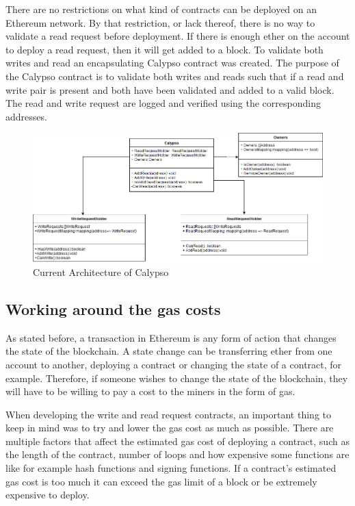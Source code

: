 \documentclass[12pt]{article}
\begin{document}
There are no restrictions on what kind of contracts can be deployed on an Ethereum network. By that restriction, or lack thereof, there is no way to validate a read request before deployment. If there is enough ether on the account to deploy a read request, then it will get added to a block. To validate both writes and read an encapsulating Calypso contract was created. The purpose of the Calypso contract is to validate both writes and reads such that if a read and write pair is present and both have been validated and added to a valid block. The read and write request are logged and verified using the corresponding addresses.

\begin{figure}[H]
    \centering
    \includegraphics[width=1\textwidth]{UMLCalypso.png}
    \caption{Current Architecture of Calypso}
    \label{fig:calypsoStructure}
\end{figure}

\subsection{Working around the gas costs}

As stated before, a transaction in Ethereum is any form of action that changes the state of the blockchain. A state change can be transferring ether from one account to another, deploying a contract or changing the state of a contract, for example. Therefore, if someone wishes to change the state of the blockchain, they will have to be willing to pay a cost to the miners in the form of gas.

When developing the write and read request contracts, an important thing to keep in mind was to try and lower the gas cost as much as possible. There are multiple factors that affect the estimated gas cost of deploying a contract, such as the length of the contract, number of loops and how expensive some functions are like for example hash functions and signing functions. If a contract’s estimated gas cost is too much it can exceed the gas limit of a block or be extremely expensive to deploy.
\end{document}
